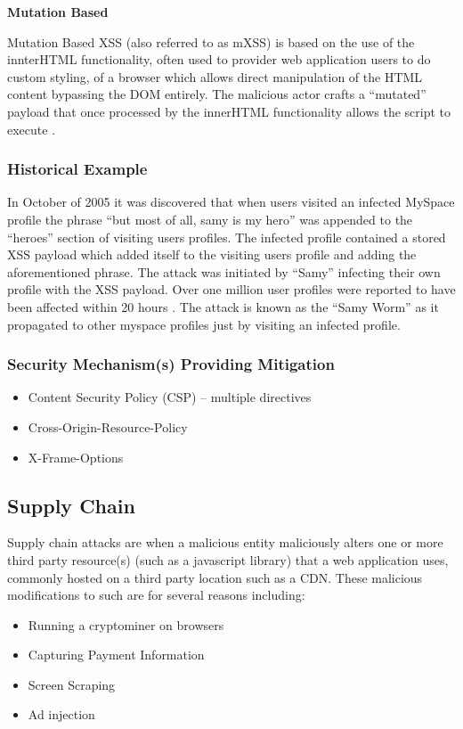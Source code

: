 \documentclass{mscreport}
\begin{document}
\vspace{0.6cm} \noindent
\textbf{Mutation Based}

\vspace{0.2cm} \noindent
Mutation Based XSS (also referred to as mXSS) is based on the use of the innterHTML functionality, often used to provider web application users to do custom styling, of a browser which allows direct manipulation of the HTML content bypassing the DOM entirely. The malicious actor crafts a “mutated” payload that once processed by the innerHTML functionality allows the script to execute \cite{Heiderich2013-qv}.

\subsubsection{Historical Example}
In October of 2005 it was discovered that when users visited an infected MySpace profile the phrase “but most of all, samy is my hero” was appended to the “heroes” section of visiting users profiles. The infected profile contained a stored XSS payload which added itself to the visiting users profile and adding the aforementioned phrase. The attack was initiated by “Samy” infecting their own profile with the XSS payload. Over one million user profiles were reported to have been affected within 20 hours \cite{Lee2019-xf}.
The attack is known as the “Samy Worm” as it propagated to other myspace profiles just by visiting an infected profile.

\subsubsection{Security Mechanism(s) Providing Mitigation}

\begin{itemize}
	\setlength\itemsep{0.1em}
	\item Content Security Policy (CSP) – multiple directives
	\item Cross-Origin-Resource-Policy
	\item X-Frame-Options
\end{itemize}


\subsection{Supply Chain}
\label{subsection:SupplyChain}

Supply chain attacks are when a malicious entity maliciously alters one or more third party resource(s) (such as a javascript library) that a web application uses, commonly hosted on a third party location such as a CDN. These malicious modifications to such are for several reasons including:
\begin{itemize}
	\setlength\itemsep{0.1em}
	\item Running a cryptominer \cite{Tekiner2021-sq} on browsers
	\item Capturing Payment Information
	\item Screen Scraping
	\item Ad injection
\end{itemize}
\end{document}
